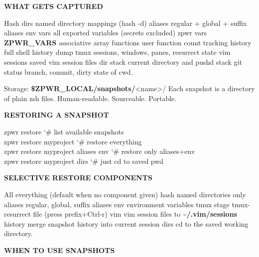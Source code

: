\documentclass[11pt,a4paper,twoside]{book}
\begin{document}
\vspace{12pt}
{\bfseries\color{neonyellow} WHAT GETS CAPTURED}\vspace{4pt}

Hash dirs         named directory mappings (hash -d) aliases           regular + global + suffix aliases env vars          all exported variables (secrets excluded) zpwr vars         \textbf{ZPWR\_VARS} associative array functions         user function count tracking history           full shell history dump tmux             sessions, windows, panes, resurrect state vim sessions      saved vim session files dir stack         current directory and pushd stack git status        branch, commit, dirty state of cwd.

Storage: \textbf{\$ZPWR\_LOCAL/snapshots/}<name>/ Each snapshot is a directory of plain zsh files. Human-readable. Sourceable. Portable.


\vspace{12pt}
{\bfseries\color{neonyellow} RESTORING A SNAPSHOT}\vspace{4pt}

\begin{codebox}
\color{neongreen}zpwr restore                        {\char`\#} list available snapshots\\
\color{neongreen}zpwr restore myproject               {\char`\#} restore everything\\
\color{neongreen}zpwr restore myproject aliases env    {\char`\#} restore only aliases+env\\
\color{neongreen}zpwr restore myproject dirs           {\char`\#} just cd to saved pwd\\
\end{codebox}


\vspace{12pt}
{\bfseries\color{neonyellow} SELECTIVE RESTORE COMPONENTS}\vspace{4pt}

All       everything (default when no component given) hash      named directories only aliases   regular, global, suffix aliases env       environment variables tmux      stage tmux-resurrect file (press prefix+Ctrl-r) vim       vim session files to \textbf{\textasciitilde{}/.vim/sessions} history   merge snapshot history into current session dirs      cd to the saved working directory.


\vspace{12pt}
{\bfseries\color{neonyellow} WHEN TO USE SNAPSHOTS}\vspace{4pt}
\end{document}

